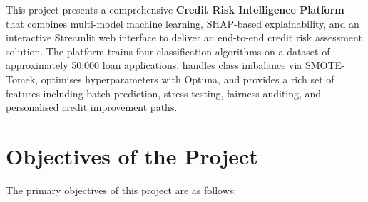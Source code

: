 \documentclass[12pt,a4paper]{report}
\begin{document}
This project presents a comprehensive \textbf{Credit Risk Intelligence Platform} that combines multi-model machine learning, SHAP-based explainability, and an interactive Streamlit web interface to deliver an end-to-end credit risk assessment solution. The platform trains four classification algorithms on a dataset of approximately 50,000 loan applications, handles class imbalance via SMOTE-Tomek, optimises hyperparameters with Optuna, and provides a rich set of features including batch prediction, stress testing, fairness auditing, and personalised credit improvement paths.


\chapter{Objectives of the Project}

The primary objectives of this project are as follows:
\end{document}
